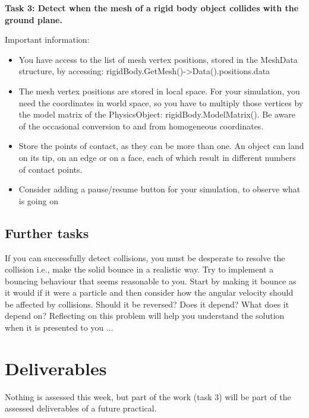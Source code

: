 \documentclass[12pt]{article}
\begin{document}
\textbf{Task 3: Detect when the mesh of a rigid body object collides with the ground plane.}

Important information:

\begin{itemize}
\item You have access to the list of mesh vertex positions, stored in the MeshData structure, by accessing: rigidBody.GetMesh()->Data().positions.data
\item The mesh vertex positions are stored in local space. For your simulation, you need the coordinates in world space, so you have to multiply those vertices by the model matrix of the PhysicsObject: rigidBody.ModelMatrix(). Be aware of the occasional conversion to and from homogeneous coordinates.
\item Store the points of contact, as they can be more than one. An object can land on its tip, on an edge or on a face, each of which result in different numbers of contact points.
\item Consider adding a pause/resume button for your simulation, to observe what is going on
\end{itemize}

\subsection*{Further tasks}

If you can successfully detect collisions, you must be desperate to resolve the collision i.e., make the solid bounce in a realistic way. Try to implement a bouncing behaviour that seems reasonable to you. Start by making it bounce as it would if it were a particle and then consider how the angular velocity should be affected by collisions. Should it be reversed? Does it depend? What does it depend on? Reflecting on this problem will help you understand the solution when it is presented to you ...

\section*{Deliverables}

Nothing is assessed this week, but part of the work  (task 3) will be part of the assessed deliverables of a future practical.
\end{document}
